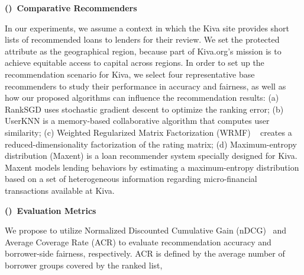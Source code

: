 \vspace{0.25cm}
\noindent \textbf{()~Comparative Recommenders}
\vspace{0.25cm}

In our experiments, we assume a context in which the Kiva site provides short lists of recommended loans to lenders for their review. We set the protected attribute as the geographical region, because part of Kiva.org's mission is to achieve equitable access to capital across regions. In order to set up the recommendation scenario for Kiva, we select four representative base recommenders to study their performance in accuracy and fairness, as well as how our proposed algorithms can influence the recommendation results: (a) RankSGD \cite{pmlr-v18-jahrer12b} uses stochastic gradient descent to optimize the ranking error; (b) UserKNN \cite{resnick1997recommender} is a memory-based collaborative algorithm that computes user similarity; (c) Weighted Regularized Matrix Factorization (WRMF) ~\cite{hu2008collaborative} creates a reduced-dimensionality factorization of the rating matrix; (d) Maximum-entropy distribution (Maxent) \cite{choo2014gather} is a loan recommender system specially designed for Kiva. Maxent models lending behaviors by estimating a maximum-entropy distribution based on a set of heterogeneous information regarding micro-financial transactions available at Kiva.


\vspace{0.25cm}
\noindent \textbf{()~Evaluation Metrics}
\vspace{0.25cm}

We propose to utilize Normalized Discounted Cumulative Gain (nDCG)~\cite{jarvelin2002cumulated} and Average Coverage Rate (ACR) to evaluate recommendation accuracy and borrower-side fairness, respectively. ACR is defined by the average number of borrower groups covered by the ranked list,

